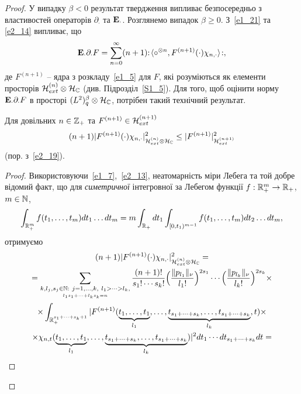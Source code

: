 \begin{proof}
У випадку $\beta<0$ результат твердження випливає безпосередньо з властивостей операторів
$\partial_\cdot$ та $\mathbf{E}_\cdot$. Розглянемо випадок $\beta\geq 0$. З~\eqref{e1_21} та
\eqref{e2_14} випливає, що
\begin{equation}\label{e2_17}
\mathbf{E}_\cdot\partial_\cdot F=\sum_{n=0}^\infty (n+1){:\!\langle}\circ^{\otimes n},
F^{(n+1)}(\cdot)\chi_{n,\cdot}{\rangle\!:},
\end{equation}
де $F^{(n+1)}$ -- ядра з розкладу~\eqref{e1_5} для $F$, які розуміються як елементи
просторів $\mathcal{H}_{ext}^{(n)}\otimes\mathcal{H}_{\mathbb{C}}$ (див. Підрозділ~\ref{S1_5}).
Для того, щоб оцінити норму $\mathbf{E}_\cdot\partial_\cdot F$ в просторі
$(L^2)^\beta_q\otimes\mathcal{H}_{\mathbb{C}}$, потрібен такий технічний результат.
\begin{sublemma}
Для довільних $n\in\mathbb{Z}_+$ та $F^{(n+1)}\in\mathcal{H}_{ext}^{(n+1)}$
\begin{equation}\label{e2_15}
(n+1)|F^{(n+1)}(\cdot)\chi_{n,\cdot}|_{\mathcal{H}_{ext}^{(n)}\otimes\mathcal{H}_{\mathbb{C}}}^2
\leq |F^{(n+1)}|_{\mathcal{H}_{ext}^{(n+1)}}^2
\end{equation}
(пор. з~\eqref{e2_19}).
\end{sublemma}
\begin{proof}
Використовуючи~\eqref{e1_7},~\eqref{e2_13}, неатомарність міри Лебега та той добре відомий факт,
що для {\it симетричної} інтегровної за Лебегом функції $f:\mathbb{R}_+^m\to\mathbb{R}_+$,
$m\in\mathbb{N}$,
\begin{equation*}
\int_{\mathbb{R}_+^m}f(t_1,\dots,t_m)dt_1\dots dt_m
=m\int_{\mathbb{R}_+}dt_1\int_{[0,t_1)^{m-1}}f(t_1,\dots,t_m)dt_2\dots dt_m,
\end{equation*}
отримуємо
\begin{gather*}
(n+1)|F^{(n+1)}(\cdot)\chi_{n,\cdot}
|_{\Hcal_{ext}^{(n)}\otimes\Hcal_{\bC}}^2=\\
=\sum_{\underset{l_1s_1+\cdots+l_ks_k=n}{k,l_j,s_j\in\bN:
\ j=1,\dots,k,\ l_1>\cdots>l_k,}}
\frac{(n+1)!}{s_1!\cdots s_k!}
\Big(\frac{\|p_{l_1}\|_\nu}{l_1!}\Big)^{2s_1}
\cdots\Big(\frac{\|p_{l_k}\|_\nu}{l_k!}\Big)^{2s_k}\times\\
\times\int_{\bR_+^{s_1+\cdots+s_k+1}}|F^{(n+1)}(
\underset{l_1}{\underbrace{t_1,\dots,t_1}},\dots,
\underset{l_k}{\underbrace{t_{s_1+\cdots+s_k},\dots,
t_{s_1+\cdots+s_k}}},t)\times\\
\times\chi_{n,t}(\underset{l_1}{\underbrace{t_1,\dots,t_1}},\dots,
\underset{l_k}{\underbrace{t_{s_1+\cdots+s_k},
\dots,t_{s_1+\cdots+s_k}}})|^2
dt_1\cdots dt_{s_1+\cdots+s_k}dt=\\

\end{gather*}
\end{proof}
\end{proof}

